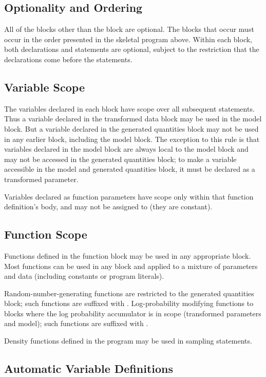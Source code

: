\subsection{Optionality and Ordering}

All of the blocks other than the  block are optional.  The
blocks that occur must occur in the order presented in the skeletal
program above.  Within each block, both declarations and statements
are optional, subject to the restriction that the declarations come
before the statements.

\subsection{Variable Scope}

The variables declared in each block have scope over all subsequent
statements.  Thus a variable declared in the transformed data block
may be used in the model block.  But a variable declared in the
generated quantities block may not be used in any earlier block,
including the model block.  The exception to this rule is that
variables declared in the model block are always local to the model
block and may not be accessed in the generated quantities block; to
make a variable accessible in the model and generated quantities
block, it must be declared as a transformed parameter.

Variables declared as function parameters have scope only within that
function definition's body, and may not be assigned to (they are
constant).

\subsection{Function Scope}

Functions defined in the function block may be used in any appropriate
block.  Most functions can be used in any block and applied to a
mixture of parameters and data (including constants or program
literals).

Random-number-generating functions are restricted to the generated
quantities block; such functions are suffixed with .
Log-probability modifying functions to blocks where the log
probability accumulator is in scope (transformed parameters and
model); such functions are suffixed with .

Density functions defined in the program may be used in sampling
statements.

\subsection{Automatic Variable Definitions}

